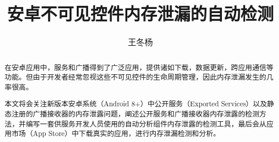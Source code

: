 \documentclass[winfonts]{njuthesis}
\title{安卓不可见控件内存泄漏的自动检测}
\author{王冬杨}
\begin{document}
\maketitle

\begin{abstract}

在安卓应用中，服务和广播得到了广泛应用，提供诸如下载，数据更新，跨应用通信等功能。但由于开发者经常忽视这些不可见控件的生命周期管理，因此内存泄漏发生的几率很高。

本文将会关注新版本安卓系统（Android 8+）中公开服务（Exported Services）以及静态注册的广播接收器的内存泄露问题，阐述公开服务和广播接收器内存泄露的检测方法，并编写一套供服务开发人员使用的自动分析组件内存泄露的检测工具，最后会从应用市场（App Store）中下载真实的应用，进行内存泄漏检测和分析。

\end{abstract}


%
%
%
%

\tableofcontents

\end{document}
